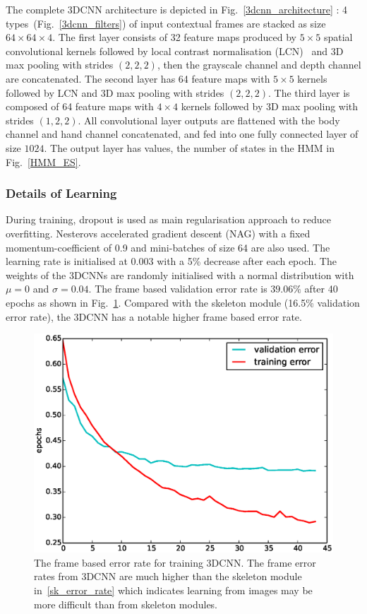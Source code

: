 The complete 3DCNN architecture is depicted in Fig.~\ref{3dcnn_architecture} : 4 types~(Fig.~\ref{3dcnn_filters}) of input contextual frames are stacked as size $64\times64\times4$.
The first layer consists of 32 feature maps produced by $5\times5$ spatial convolutional kernels followed by local contrast normalisation (LCN)~\cite{jarrett2009best} and 3D max pooling with strides $(2,2,2)$, then the grayscale channel and depth channel are concatenated. The second layer has 64 feature maps with $5\times5$ kernels followed by LCN and 3D max pooling with strides $(2,2,2)$. The third layer is composed of 64 feature maps with $4\times4$ kernels followed by 3D max pooling with strides $(1,2,2)$. All convolutional layer outputs are flattened with the body channel and hand channel concatenated, and fed into one fully connected layer of size $1024$. The output layer has \numberhiddenstates{} values, the number of states in the HMM in Fig.~\ref{HMM_ES}.




\subsubsection{Details of Learning}
During training, dropout \cite{hinton2012improving} is used as main regularisation approach to reduce overfitting. Nesterovs accelerated gradient descent (NAG) \cite{sutskever2013importance} with a fixed momentum-coefficient of 0.9 and mini-batches of size 64 are also used.
The learning rate is initialised at 0.003 with a 5\% decrease after each epoch. The weights of the 3DCNNs are randomly initialised with a normal distribution with $\mu = 0$ and $\sigma = 0.04$.
The frame based validation error rate is $39.06\%$ after 40 epochs as shown in Fig.~\ref{error rate}. Compared with the skeleton module (16.5\% validation error rate), the 3DCNN has a notable higher frame based error rate.


\begin{figure}[t]
  \centering
  \includegraphics[width=.4\textwidth]{images/3dcnn_filters/training_error}
  \caption{The frame based error rate for training 3DCNN. The frame error rates from 3DCNN are much higher than the skeleton module in~\ref{sk_error_rate} which indicates learning from images may be more difficult than from skeleton modules. }\label{error rate}
\end{figure}

